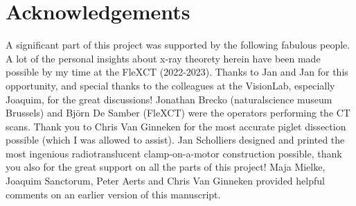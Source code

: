\section{Acknowledgements}
\label{sec:orgfff4294}
A significant part of this project was supported by the following fabulous people.
A lot of the personal insights about x-ray theorety herein have been made possible by my time at the FleXCT (2022-2023). Thanks to Jan and Jan for this opportunity, and special thanks to the colleagues at the VisionLab, especially Joaquim, for the great discussions!
Jonathan Brecko (naturalscience museum Brussels) and Björn De Samber (FleXCT) were the operators performing the CT scans.
Thank you to Chris Van Ginneken for the most accurate piglet dissection possible (which I was allowed to assist).
Jan Scholliers designed and printed the most ingenious radiotranslucent clamp-on-a-motor construction possible, thank you also for the great support on all the parts of this project!
Maja Mielke, Joaquim Sanctorum, Peter Aerts and Chris Van Ginneken provided helpful comments on an earlier version of this manuscript.

